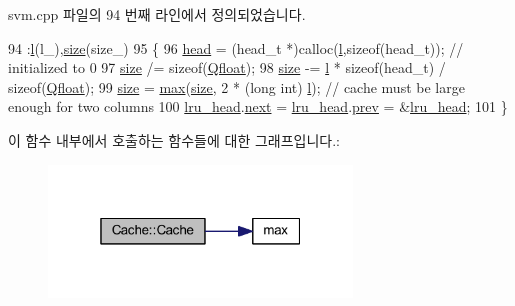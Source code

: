 svm.\+cpp 파일의 94 번째 라인에서 정의되었습니다.


\begin{DoxyCode}
94                                  :\hyperlink{class_cache_a8f5881aa763cb4af5cfb7b6bda0cff35}{l}(l\_),\hyperlink{class_cache_af50a89d0734a160cf812384df64599f9}{size}(size\_)
95 \{
96     \hyperlink{class_cache_aaf3674e8de1e3896dba64b4caac79f0a}{head} = (head\_t *)calloc(\hyperlink{class_cache_a8f5881aa763cb4af5cfb7b6bda0cff35}{l},\textcolor{keyword}{sizeof}(head\_t)); \textcolor{comment}{// initialized to 0}
97     \hyperlink{class_cache_af50a89d0734a160cf812384df64599f9}{size} /= \textcolor{keyword}{sizeof}(\hyperlink{svm_8cpp_a8755d90a54ecfb8d15051af3e0542592}{Qfloat});
98     \hyperlink{class_cache_af50a89d0734a160cf812384df64599f9}{size} -= \hyperlink{class_cache_a8f5881aa763cb4af5cfb7b6bda0cff35}{l} * \textcolor{keyword}{sizeof}(head\_t) / \textcolor{keyword}{sizeof}(\hyperlink{svm_8cpp_a8755d90a54ecfb8d15051af3e0542592}{Qfloat});
99     \hyperlink{class_cache_af50a89d0734a160cf812384df64599f9}{size} = \hyperlink{svm_8cpp_a7cba98555a7346b01e4cc06205527d8a}{max}(\hyperlink{class_cache_af50a89d0734a160cf812384df64599f9}{size}, 2 * (\textcolor{keywordtype}{long} \textcolor{keywordtype}{int}) \hyperlink{class_cache_a8f5881aa763cb4af5cfb7b6bda0cff35}{l}); \textcolor{comment}{// cache must be large enough for two columns}
100     \hyperlink{class_cache_a91fc6bd9c69ed37e8e0499da8d47794e}{lru\_head}.\hyperlink{struct_cache_1_1head__t_aa152a104ec07250949c234d164f5f3fd}{next} = \hyperlink{class_cache_a91fc6bd9c69ed37e8e0499da8d47794e}{lru\_head}.\hyperlink{struct_cache_1_1head__t_a82b1a4d1a105769f85cce8d51c19860e}{prev} = &\hyperlink{class_cache_a91fc6bd9c69ed37e8e0499da8d47794e}{lru\_head};
101 \}
\end{DoxyCode}


이 함수 내부에서 호출하는 함수들에 대한 그래프입니다.\+:
\nopagebreak
\begin{figure}[H]
\begin{center}
\leavevmode
\includegraphics[width=229pt]{class_cache_a2823f543d4f9b92c29472b904961afe1_cgraph}
\end{center}
\end{figure}


